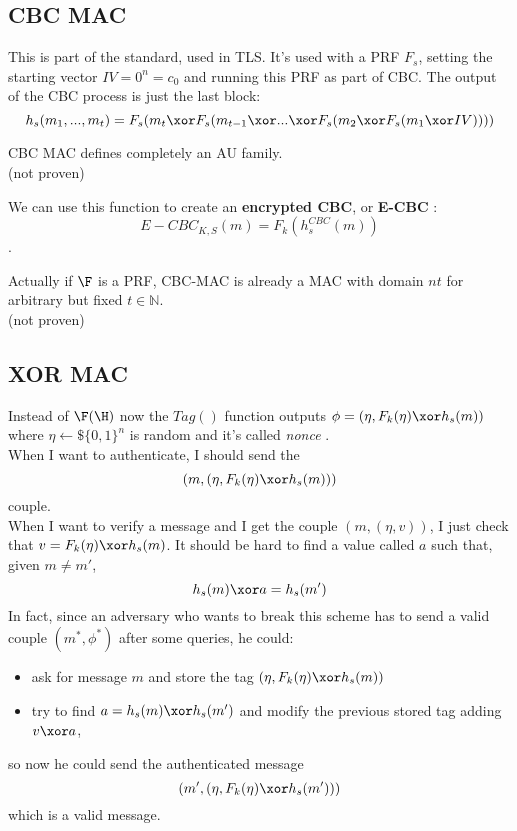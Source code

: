 \subsection{CBC MAC}
This is part of the standard, used in TLS. It's used with a PRF $F_{s}$, setting
the starting vector $IV=0^{n}=c_{0}$ and running this PRF as part of CBC. The
output of the CBC process is just the last block:
\[
    h_{s}(m_{1}, ..., m_{t})=F_{s} ( m_{t} \xor F_{s}(m_{t-1} \xor ... \xor 
    F_{s}(m_{2} \xor F_{s}(m_{1} \xor IV))  ))
\]
\begin{lemma}
    CBC MAC defines completely an AU family.\\
    (not proven)
\end{lemma}

We can use this function to create an \textbf{encrypted CBC}, or \textbf{E-CBC}  :
\[
    E-CBC_{K, S}(m)=F_{k}(h_{s}^{CBC}(m))
\]
.
\begin{theorem}
    Actually if $\F$ is a PRF, CBC-MAC is already a MAC with domain $nt$ for
    arbitrary but fixed $t \in \mathbb{N} $.\\
    (not proven)
\end{theorem}

\subsection{XOR MAC}
Instead of $\F(\H)$ now the $Tag()$ function outputs $\phi = (\eta , F_{k}(\eta)
\xor h_{s}(m))$ where $\eta \leftarrow\$ \{0,1\}^{n}$ is random and it's called
\textit{nonce} .\\
When I want to authenticate, I should send the
\[
    (m,( \eta, F_{k}(\eta)\xor h_{s}(m)))
\]
couple.\\
When I want to verify a message and I get the couple $(m, (\eta, v))$, I just
check that $v=F_{k}(\eta) \xor h_{s}(m)$. It should be hard to find a value
called $a$ such that, given $m \not= m'$, 
\[
    h_{s}(m) \xor a= h_{s}(m')
\]
In fact, since an adversary who wants to break this scheme has to send a valid
couple $(m^{*}, \phi^{*})$ after some queries, he could:
\begin{itemize}
    \item ask for message $m$ and store the tag $( \eta, F_{k}(\eta)\xor h_{s}(m))$
    \item try to find $a=h_{s}(m) \xor h_{s}(m')$ and modify the previous stored
        tag adding $v \xor a$, 
\end{itemize}
so now he could send the authenticated message
\[
    (m', (\eta, F_{k}(\eta) \xor h_{s}(m'))) 
\]
which is a valid message.\\

